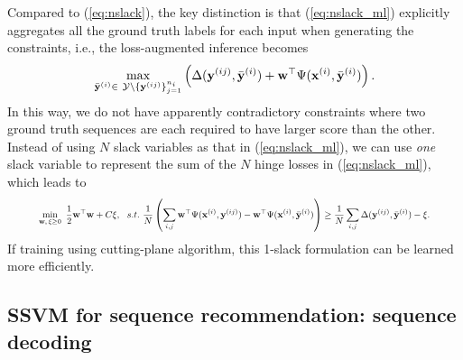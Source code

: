 Compared to (\ref{eq:nslack}), the key distinction is that (\ref{eq:nslack_ml})
explicitly aggregates all the ground truth labels for each input when generating the constraints,
i.e., the loss-augmented inference becomes
\begin{equation}
\label{eq:loss_aug_inf}
\max_{\bar{\mathbf{y}}^{(i)} \in \ \mathcal{Y} \setminus \{\mathbf{y}^{(ij)}\}_{j=1}^{n_i}}
     \left( \Delta(\mathbf{y}^{(ij)}, \bar{\mathbf{y}}^{(i)}) + \mathbf{w}^\top \Psi(\mathbf{x}^{(i)}, \bar{\mathbf{y}}^{(i)}) \right).
\end{equation}
In this way, we do not have apparently contradictory constraints where
two ground truth sequences are each required to have larger score than the other.
Instead of using $N$ slack variables as that in (\ref{eq:nslack_ml}),
we can use \emph{one} slack variable to represent the sum of the $N$ hinge losses in (\ref{eq:nslack_ml}),
which leads to %
\begin{equation}
\label{eq:1slack_ml}
\resizebox{0.9\linewidth}{!}{$
\begin{aligned}
\min_{\w, \, \xi \ge 0} ~\frac{1}{2} \w^\top \w + C \xi, ~~s.t.~ \frac{1}{N} \left( \sum_{i,j} \w^\top \Psi(\x^{(i)}, \y^{(ij)}) - \w^\top \Psi(\x^{(i)}, \bar{\y}^{(i)}) \right) 
  \ge \frac{1}{N} \sum_{i,j} \Delta(\y^{(ij)}, \bar{\y}^{(i)}) - \xi.
\end{aligned}
$}
\end{equation}
If training using cutting-plane algorithm, %
this 1-slack formulation can be learned more efficiently. %



\subsection{SSVM for sequence recommendation: sequence decoding}
\label{ssec:subtour}
\label{ssec:SRinf}

